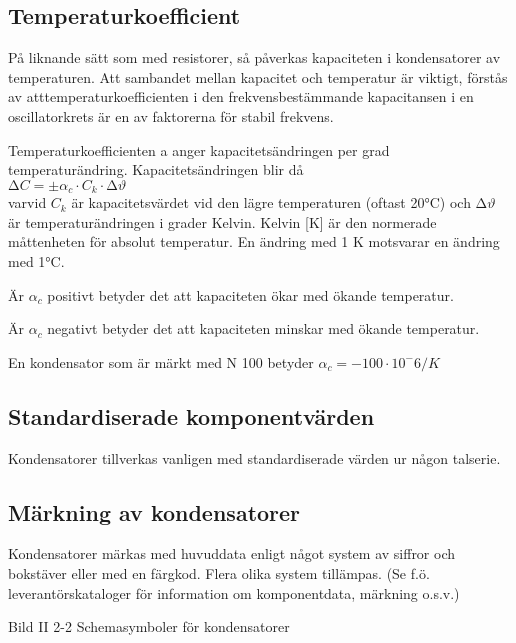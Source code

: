 \subsection{Temperaturkoefficient}

På liknande sätt som med resistorer, så påverkas kapaciteten i kondensatorer av
temperaturen. Att sambandet mellan kapacitet och temperatur är viktigt, förstås
av atttemperaturkoefficienten i den frekvensbestämmande kapacitansen i en
oscillatorkrets är en av faktorerna för stabil frekvens.

Temperaturkoefficienten a anger kapacitetsändringen per grad temperaturändring.
Kapacitetsändringen blir då \\
\(∆C = \pm \alpha _c \cdot C_k \cdot ∆\vartheta\) \\
varvid \(C_k\) är kapacitetsvärdet vid den lägre temperaturen (oftast 20°C) och
\(∆\vartheta\) är temperaturändringen i grader Kelvin.
Kelvin [K] är den normerade måttenheten för absolut temperatur.
En ändring med 1 K motsvarar en ändring med 1°C.

Är \(\alpha _c\) positivt betyder det att kapaciteten ökar med ökande
temperatur.

Är \(\alpha _c\) negativt betyder det att kapaciteten minskar med ökande
temperatur.

En kondensator som är märkt med N 100 betyder
\(\alpha _c = -100 \cdot 10^-6 / K\)

\subsection{Standardiserade komponentvärden}

Kondensatorer tillverkas vanligen med standardiserade värden ur någon talserie.

\subsection{Märkning av kondensatorer}

Kondensatorer märkas med huvuddata enligt något system av siffror och bokstäver
eller med en färgkod. Flera olika system tillämpas.
(Se f.ö. leverantörskataloger för information om komponentdata, märkning o.s.v.)

Bild II 2-2 Schemasymboler för kondensatorer
